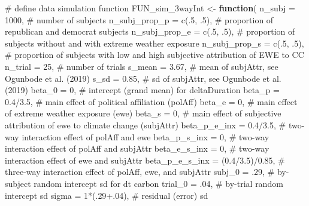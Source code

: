 \documentclass[
  letterpaper,
  DIV=11,
  numbers=noendperiod]{scrartcl}
\newenvironment{Shaded}{\begin{snugshade}}{\end{snugshade}}
\newcommand{\AttributeTok}[1]{\textcolor[rgb]{0.40,0.45,0.13}{#1}}
\newcommand{\CommentTok}[1]{\textcolor[rgb]{0.37,0.37,0.37}{#1}}
\newcommand{\ControlFlowTok}[1]{\textcolor[rgb]{0.00,0.23,0.31}{\textbf{#1}}}
\newcommand{\DecValTok}[1]{\textcolor[rgb]{0.68,0.00,0.00}{#1}}
\newcommand{\FloatTok}[1]{\textcolor[rgb]{0.68,0.00,0.00}{#1}}
\newcommand{\FunctionTok}[1]{\textcolor[rgb]{0.28,0.35,0.67}{#1}}
\newcommand{\NormalTok}[1]{\textcolor[rgb]{0.00,0.23,0.31}{#1}}
\newcommand{\OtherTok}[1]{\textcolor[rgb]{0.00,0.23,0.31}{#1}}
\newcommand{\SpecialCharTok}[1]{\textcolor[rgb]{0.37,0.37,0.37}{#1}}
\begin{document}
\begin{Shaded}
\begin{Highlighting}[]
\CommentTok{\# define data simulation function}
\NormalTok{FUN\_sim\_3wayInt }\OtherTok{\textless{}{-}} \ControlFlowTok{function}\NormalTok{(}
  \AttributeTok{n\_subj         =}                \DecValTok{1000}\NormalTok{, }\CommentTok{\# number of subjects}
  \AttributeTok{n\_subj\_prop\_p  =}           \FunctionTok{c}\NormalTok{(.}\DecValTok{5}\NormalTok{, .}\DecValTok{5}\NormalTok{), }\CommentTok{\# proportion of republican and democrat subjects}
  \AttributeTok{n\_subj\_prop\_e  =}           \FunctionTok{c}\NormalTok{(.}\DecValTok{5}\NormalTok{, .}\DecValTok{5}\NormalTok{), }\CommentTok{\# proportion of subjects without and with extreme weather exposure}
  \AttributeTok{n\_subj\_prop\_s  =}           \FunctionTok{c}\NormalTok{(.}\DecValTok{5}\NormalTok{, .}\DecValTok{5}\NormalTok{), }\CommentTok{\# proportion of subjects with low and high subjective attribution of EWE to CC}
  \AttributeTok{n\_trial        =}                  \DecValTok{25}\NormalTok{, }\CommentTok{\# number of trials}
  \AttributeTok{s\_mean         =}                \FloatTok{3.67}\NormalTok{, }\CommentTok{\# mean of subjAttr, see Ogunbode et al. (2019)}
  \AttributeTok{s\_sd           =}                \FloatTok{0.85}\NormalTok{, }\CommentTok{\# sd of subjAttr, see Ogunbode et al. (2019)}
  \AttributeTok{beta\_0         =}                   \DecValTok{0}\NormalTok{, }\CommentTok{\# intercept (grand mean) for deltaDuration}
  \AttributeTok{beta\_p         =}             \FloatTok{0.4}\SpecialCharTok{/}\FloatTok{3.5}\NormalTok{, }\CommentTok{\# main effect of political affiliation (polAff)}
  \AttributeTok{beta\_e         =}                   \DecValTok{0}\NormalTok{, }\CommentTok{\# main effect of extreme weather exposure (ewe)}
  \AttributeTok{beta\_s         =}                   \DecValTok{0}\NormalTok{, }\CommentTok{\# main effect of subjective attribution of ewe to climate change (subjAttr)}
  \AttributeTok{beta\_p\_e\_inx   =}             \FloatTok{0.4}\SpecialCharTok{/}\FloatTok{3.5}\NormalTok{, }\CommentTok{\# two{-}way interaction effect of polAff and ewe}
  \AttributeTok{beta\_p\_s\_inx   =}                   \DecValTok{0}\NormalTok{, }\CommentTok{\# two{-}way interaction effect of polAff and subjAttr}
  \AttributeTok{beta\_e\_s\_inx   =}                   \DecValTok{0}\NormalTok{, }\CommentTok{\# two{-}way interaction effect of ewe and subjAttr}
  \AttributeTok{beta\_p\_e\_s\_inx =}\NormalTok{      (}\FloatTok{0.4}\SpecialCharTok{/}\FloatTok{3.5}\NormalTok{)}\SpecialCharTok{/}\FloatTok{0.85}\NormalTok{, }\CommentTok{\# three{-}way interaction effect of polAff, ewe, and subjAttr}
  \AttributeTok{subj\_0         =}\NormalTok{                 .}\DecValTok{29}\NormalTok{, }\CommentTok{\# by{-}subject random intercept sd for dt carbon}
  \AttributeTok{trial\_0        =}\NormalTok{                 .}\DecValTok{04}\NormalTok{, }\CommentTok{\# by{-}trial random intercept sd}
  \AttributeTok{sigma          =}         \DecValTok{1}\SpecialCharTok{*}\NormalTok{(.}\DecValTok{29}\FloatTok{+.04}\NormalTok{), }\CommentTok{\# residual (error) sd}
  

\end{Highlighting}
\end{Shaded}
\end{document}
